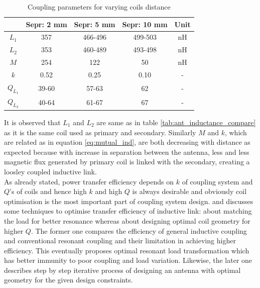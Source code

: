 \documentclass[UKenglish]{ifimaster}  %
\begin{document}
\begin{table}[H]
\caption{Coupling parameters for varying coils distance} 
\begin{center}
\begin{tabular}{c|c|c|c|c}
\hline \hline
 			& \textbf{Sepr: 2 mm}	& \textbf{Sepr: 5 mm} 	& \textbf{Sepr: 10 mm}	& \textbf{Unit}\\ \hline \hline
$L_{1}$		& 357					& 466-496				& 499-503				& \si{\nano\henry} \\ \hline
$L_{2}$		& 353					& 460-489				& 493-498				& \si{\nano\henry} \\ \hline
$M$			& 254					& 122					& 50					& \si{\nano\henry} \\ \hline
$k$			& 0.52					& 0.25					& 0.10					& -		   \\ \hline
$Q_{L_{1}}$	& 39-60					& 57-63					& 62	 				& -		   \\ \hline
$Q_{L_{2}}$	& 40-64					& 61-67					& 67	 				& -		   \\
\hline \hline
\end{tabular}
\end{center}
\label{tab:ant_couple_parameter}
\end{table}%

It is observed that $L_{1}$ and $L_{2}$ are same as in table \ref{tab:ant_inductance_compare} as it is the same coil used as primary 
and secondary. Similarly $M$ and $k$, which are related as in equation \ref{eq:mutual_ind}, are both decreasing with distance as expected because with 
increase in separation between the antenna, less and less magnetic flux generated by primary coil is linked with the secondary, creating a loosley
coupled inductive link. \\

As already stated, power transfer efficiency depends on $k$ of coupling system and $Q$'s of coils and hence high $k$ and high $Q$ is always desirable and obviously 
coil optimisation is the most important part of coupling system design. \cite{ant_optimal_resonance} and \cite{ant_PSC_geometry} 
discusses some techniques to optimise transfer efficiency of inductive link: \cite{ant_optimal_resonance} about matching the 
load for better resonance whereas \cite{ant_PSC_geometry} about designing optimal coil geometry for higher $Q$. The former one 
compares the efficiency of general inductive coupling and conventional resonant coupling and their limitation in achieving 
higher efficiency. This eventually proposes optimal resonant load transformation which has better immunity to poor coupling 
and load variation. Likewise, the later one describes step by step iterative process of designing an antenna with optimal geometry for the given 
design constraints. \\
\end{document}
